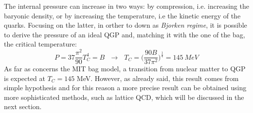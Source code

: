 The internal pressure can increase in two ways: by compression, i.e. increasing the baryonic density, or by increasing the temperature, i.e the kinetic energy of the quarks. Focusing on the latter, in orther to down as \textit{Bjorken regime}, it is possible to derive the pressure of an ideal QGP and, matching it with the one of the bag, the critical temperature:
%
\begin{equation}
  P = 37 \frac{\pi^{2}}{90}T^{4}_{C} = B \ \ \ \longrightarrow \ \ \ T_{C} = \Big(\frac{90B}{37\pi^{2}}\Big)^{\frac{1}{4}}= 145 \ MeV
\end{equation}
%
As far as concerns the MIT bag model, a transition from nuclear matter to QGP is expected at $T_{C} = 145$ MeV. However, as already said, this result comes from simple hypothesis and for this reason a more precise result can be obtained using more sophisticated methods, such as lattice QCD, which will be discussed in the next section.\\

